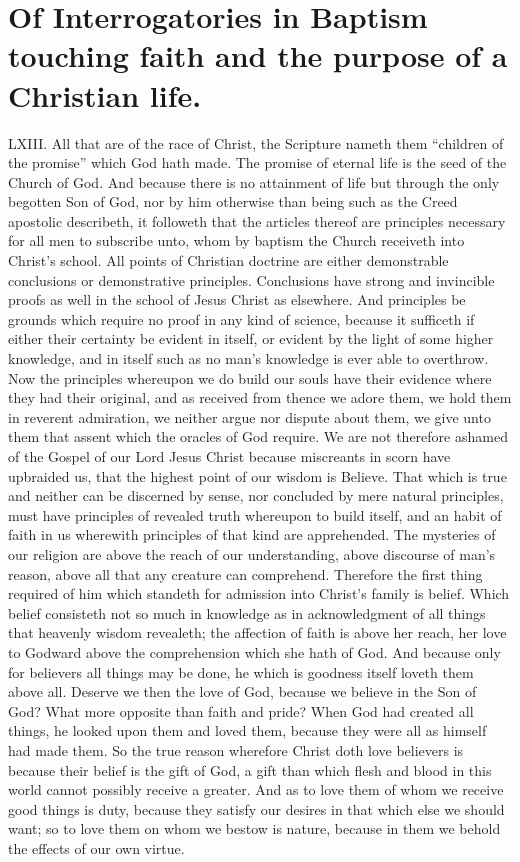 \section*{Of Interrogatories in Baptism touching faith and the purpose of a Christian life.}
LXIII. All that are of the race of Christ, the Scripture nameth them “children of the promise” which God hath made. The promise of eternal life is the seed of the Church of God. And because there is no attainment of life but through the only begotten Son of God, nor by him otherwise than being such as the Creed apostolic describeth, it followeth that the articles thereof are principles necessary for all men to subscribe unto, whom by baptism the Church receiveth into Christ’s school.
All points of Christian doctrine are either demonstrable conclusions or demonstrative principles. Conclusions have strong and invincible proofs as well in the school of Jesus Christ as elsewhere. And principles be grounds which require no proof in any kind of science, because it sufficeth if either their certainty be evident in itself, or evident by the light of some higher knowledge, and in itself such as no  man’s knowledge is ever able to overthrow. Now the principles whereupon we do build our souls have their evidence where they had their original, and as received from thence we adore them, we hold them in reverent admiration, we neither argue nor dispute about them, we give unto them that assent which the oracles of God require.
We are not therefore ashamed of the Gospel of our Lord Jesus Christ because miscreants in scorn have upbraided us, that the highest point of our wisdom is Believe. That which is true and neither can be discerned by sense, nor concluded by mere natural principles, must have principles of revealed truth whereupon to build itself, and an habit of faith in us wherewith principles of that kind are apprehended. The mysteries of our religion are above the reach of our understanding, above discourse of man’s reason, above all that any creature can comprehend. Therefore the first thing required of him which standeth for admission into Christ’s family is belief. Which belief consisteth not so much in knowledge as in acknowledgment of all things that heavenly wisdom revealeth; the affection of faith is above her reach, her love to Godward above the comprehension which she hath of God.
And because only for believers all things may be done, he which is goodness itself loveth them above all. Deserve we then the love of God, because we believe in the Son of God? What more opposite than faith and pride? When God had created all things, he looked upon them and loved them, because they were all as himself had made them. So the true reason wherefore Christ doth love believers is because their belief is the gift of God, a gift than which flesh and blood in this world cannot possibly receive a greater. And as to love them of whom we receive good things is duty, because they satisfy our desires in that which else we should want; so to love them on whom we bestow is nature, because in them we behold the effects of our own virtue.
